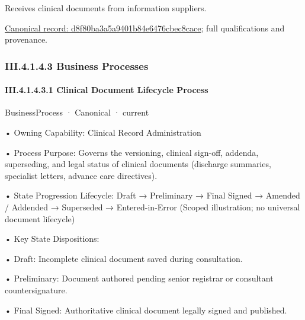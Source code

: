 Receives clinical documents from information suppliers.


{\footnotesize \href{../../../../continuum/business/business-function/d8f80ba3a5a9401b84e6476cbec8cace.md}{Canonical record: d8f80ba3a5a9401b84e6476cbec8cace}; full qualifications and provenance.}\par
\subsubsection*{III.4.1.4.3 Business Processes}
\label{navigation:III.4.1.4.3}

\paragraph*{III.4.1.4.3.1 Clinical Document Lifecycle Process}
\label{navigation:III.4.1.4.3.1}

\label{element:eacdec16b96844b4963b8a960d1a8666}
{\small BusinessProcess · Canonical · current}\par

•
Owning Capability: Clinical Record Administration



•
Process Purpose: Governs the versioning, clinical sign-off, addenda, superseding, and legal status of clinical documents (discharge summaries, specialist letters, advance care directives).



•
State Progression Lifecycle: Draft → Preliminary → Final Signed → Amended / Addended → Superseded → Entered-in-Error   (Scoped illustration; no universal document lifecycle)



•
Key State Dispositions:



•
Draft: Incomplete clinical document saved during consultation.



•
Preliminary: Document authored pending senior registrar or consultant countersignature.



•
Final Signed: Authoritative clinical document legally signed and published.



